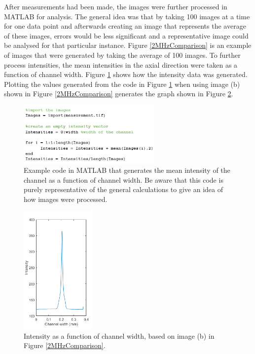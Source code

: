 \documentclass[twoside,twocolumn,9pt,a4paper]{IEEEtran}
\begin{document}
After measurements had been made, the images were further processed in MATLAB for analysis. The general idea was that by taking 100 images at a time for one data point and afterwards creating an image that represents the average of these images, errors would be less significant and a representative image could be analysed for that particular instance. Figure \ref{2MHzComparison} is an example of images that were generated by taking the average of 100 images. To further process intensities, the mean intensities in the axial direction were taken as a function of channel width. Figure \ref{codeexample} shows how the intensity data was generated. Plotting the values generated from the code in Figure \ref{codeexample} when using image (b) shown in Figure \ref{2MHzComparison} generates the graph shown in Figure \ref{example}.

\begin{figure}[H]
\begin{center}
\includegraphics[width=7cm]{Images/code example.png} %
\caption{Example code in MATLAB that generates the mean intensity of the channel as a function of channel width. Be aware that this code is purely representative of the general calculations to give an idea of how images were processed.}
\label{codeexample}
\end{center}
\end{figure} %

\begin{figure}[H]
\begin{center}
\includegraphics[width=3.7cm]{Images/example.png} %
\caption{Intensity as a function of channel width, based on image (b) in Figure \ref{2MHzComparison}.}
\label{example}
\end{center}
\end{figure} %
\end{document}
